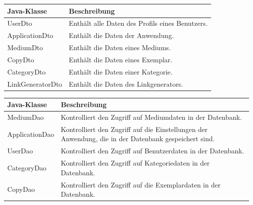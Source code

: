 \documentclass{article}
\begin{document}
\begin{center}
    \begin{table}
        \begin{tabular} { |p{}|p{}| }
            \hline
            Java-Klasse & Beschreibung  \\
             \hline\hline
            UserDto & Enthält alle Daten des Profils eines Benutzers. \\
            ApplicationDto & Enthält die Daten der Anwendung. \\
            \hline
            MediumDto & Enthält die Daten eines Mediums. \\
            \hline
            CopyDto & Enthält die   Daten eines Exemplar. \\
            \hline
            CategoryDto & Enthält die Daten einer Kategorie. \\
            \hline
            LinkGeneratorDto & Enthält die Daten des Linkgenerators. \\
            \hline
        \end{tabular}
        \end{table}
        \end{center}


  \begin{center}
    \begin{table}
        \begin{tabular} { |p{}|p{}| }
             \hline
            Java-Klasse & Beschreibung \\
            \hline\hline
            MediumDao & Kontrolliert den Zugriff auf Mediumdaten in der Datenbank. \\
             \hline
            ApplicationDao & Kontrolliert den Zugriff auf die Einstellungen der Anwendung, die in der Datenbank gespeichert sind. \\
            \hline
            UserDao & Kontrolliert den Zugriff auf Benutzerdaten in der Datenbank. \\
            \hline
            CategoryDao & Kontrolliert den Zugriff auf Kategoriedaten in der Datenbank. \\
            \hline
            CopyDao & Kontrolliert den Zugriff auf die Exemplardaten in der Datenbank. \\
            \hline
        \end{tabular}
        \end{table}
        \end{center}
\end{document}
